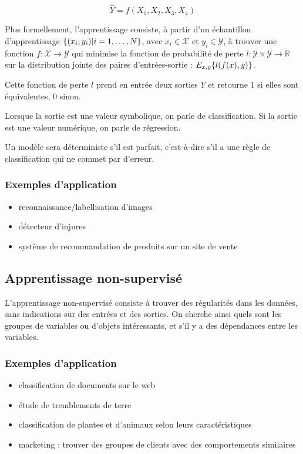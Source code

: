 		$$\hat{Y} = f(X_1, X_2, X_3, X_4)$$

		Plus formellement, l'apprentissage consiste, à partir d'un échantillon d'apprentissage $\lbrace (x_i, y_i) \vert i = 1, \dots , N \rbrace$, avec $x_i \in \mathcal{X}$ et $y_i \in \mathcal{Y}$, à trouver une fonction $f : \mathcal{X} \rightarrow \mathcal{Y}$ qui minimise la fonction de probabilité de perte $l : \mathcal{Y} \times \mathcal{Y} \rightarrow \mathbb{R}$ sur la distribution jointe des paires d'entrées-sortie : $E_{x, y} \lbrace l(f(x), y) \rbrace$.

		Cette fonction de perte $l$ prend en entrée deux sorties $Y$ et retourne 1 si elles sont équivalentes, 0 sinon.

		Lorsque la sortie est une valeur symbolique, on parle de classification. Si la sortie est une valeur numérique, on parle de régression.

		Un modèle sera déterministe s'il est parfait, c'est-à-dire s'il a une règle de classification qui ne commet par d'erreur.
		
		\subsubsection{Exemples d'application}
			
			\begin{itemize}
				\item reconnaissance/labellisation d'images
				\item détecteur d'injures
				\item système de recommandation de produits sur un site de vente
			\end{itemize}
		
		
		\subsection{Apprentissage non-supervisé}
		
		L'apprentissage non-supervisé consiste à trouver des régularités dans les données, sans indications sur des entrées et des sorties. On cherche ainsi quels sont les groupes de variables ou d'objets intéressants, et s'il y a des dépendances entre les variables.
		
			\subsubsection{Exemples d'application}
			
			\begin{itemize}
				\item classification de documents sur le web
				\item étude de tremblements de terre
				\item classification de plantes et d'animaux selon leurs caractéristiques
				\item marketing : trouver des groupes de clients avec des comportements similaires
			\end{itemize}
		
